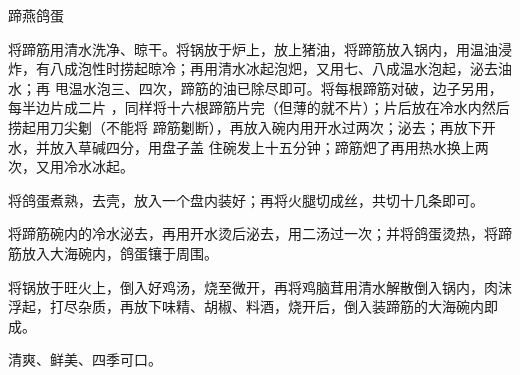 \begin{recipe}{蹄燕鸽蛋}

\ingredients


\preparation

\step 将蹄筋用清水洗净、晾干。将锅放于炉上，放上猪油，将蹄筋放入锅内，用温油浸
炸，有八成泡性时捞起晾冷；再用清水冰起泡𤆵，又用七、八成温水泡起，泌去油水；再
甩温水泡三、四次，蹄筋的油已除尽即可。将每根蹄筋对破，边子另用，每半边片成二片
，同样将十六根蹄筋片完（但薄的就不片）；片后放在冷水内然后捞起用刀尖劖（不能将
蹄筋劖断），再放入碗内用开水过两次；泌去；再放下开水，并放入草碱四分，用盘子盖
住碗发上十五分钟；蹄筋𤆵了再用热水换上两次，又用冷水冰起。

\step 将鸽蛋煮熟，去壳，放入一个盘内装好；再将火腿切成丝，共切十几条即可。

\step 将蹄筋碗内的冷水泌去，再用开水烫后泌去，用二汤过一次；并将鸽蛋烫热，将蹄
筋放入大海碗内，鸽蛋镶于周围。

\step 将锅放于旺火上，倒入好鸡汤，烧至微开，再将鸡脑茸用清水解散倒入锅内，肉沫
浮起，打尽杂质，再放下味精、胡椒、料酒，烧开后，倒入装蹄筋的大海碗内即成。

\features

清爽、鲜美、四季可口。

\end{recipe}

